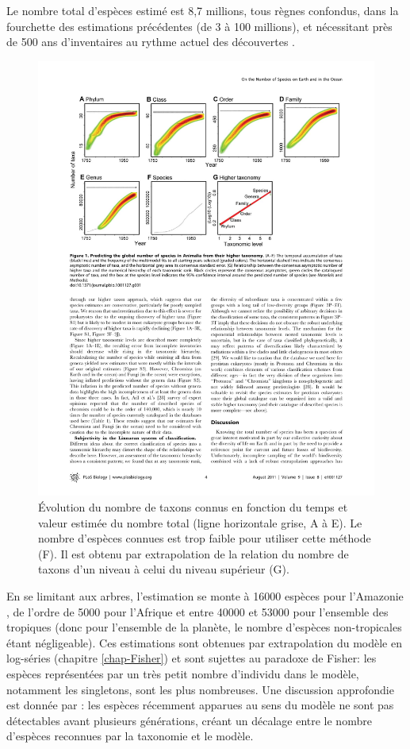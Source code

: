 \documentclass[
  11pt,
  french,
  a4paper,
  extrafontsizes,onecolumn,openright
  ]{memoir}
\begin{document}
Le nombre total d'espèces estimé est 8,7 millions, tous règnes confondus, dans la fourchette des estimations précédentes (de 3 à 100 millions), et nécessitant près de 500 ans d'inventaires au rythme actuel des découvertes \autocite{May2011}.



\scriptsize

\begin{figure}

{\centering \includegraphics[width=0.8\linewidth]{images/Mora2011} 

}

\caption{Évolution du nombre de taxons connus en fonction du temps et valeur estimée du nombre total (ligne horizontale grise, A à E). Le nombre d'espèces connues est trop faible pour utiliser cette méthode (F). Il est obtenu par extrapolation de la relation du nombre de taxons d'un niveau à celui du niveau supérieur (G).}\label{fig:Mora2011}
\end{figure}

\normalsize

En se limitant aux arbres, l'estimation se monte à 16000 espèces pour l'Amazonie \autocite{TerSteege2013}, de l'ordre de 5000 pour l'Afrique et entre 40000 et 53000 pour l'ensemble des tropiques \autocite{Slik2015} (donc pour l'ensemble de la planète, le nombre d'espèces non-tropicales étant négligeable).
Ces estimations sont obtenues par extrapolation du modèle en log-séries (chapitre \ref{chap-Fisher}) et sont sujettes au paradoxe de Fisher: les espèces représentées par un très petit nombre d'individu dans le modèle, notamment les singletons, sont les plus nombreuses.
Une discussion approfondie est donnée par \textcite{Hubbell2015}: les espèces récemment apparues au sens du modèle ne sont pas détectables avant plusieurs générations, créant un décalage entre le nombre d'espèces reconnues par la taxonomie et le modèle.
\end{document}
